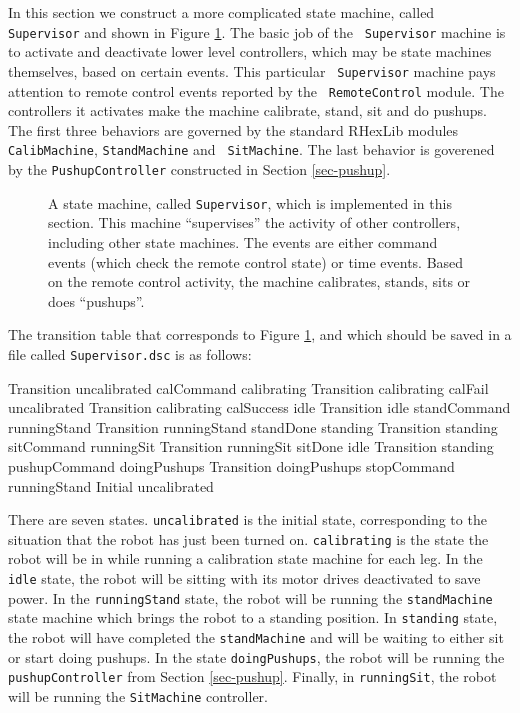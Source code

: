 In this section we construct a more complicated state machine, called {\tt
Supervisor} and shown in Figure \ref{fig-supervisor}. The basic job of the {\tt
Supervisor} machine is to activate and deactivate lower level controllers, which
may be state machines themselves, based on certain events. This particular {\tt
Supervisor} machine pays attention to remote control events reported by the {\tt
RemoteControl} module. The controllers it activates make the machine calibrate,
stand, sit and do pushups. The first three behaviors are governed by the
standard RHexLib modules {\tt CalibMachine}, {\tt StandMachine} and {\tt
SitMachine}. The last behavior is goverened by the {\tt PushupController}
constructed in Section \ref{sec-pushup}.

\begin{figure}[t]
\begin{center}
\caption{A state machine, called {\tt Supervisor}, which is implemented
in this section. This machine ``supervises'' the activity of other controllers,
including other state machines. The events are either command events (which
check the remote control state) or time events. Based on the remote control
activity, the machine calibrates, stands, sits or does ``pushups''.
\label{fig-supervisor}
}\end{center}
\end{figure}

The transition table that corresponds to Figure \ref{fig-supervisor}, and which
should be saved in a file called {\tt Supervisor.dsc} is as follows:

\begin{codesegment}
  Transition uncalibrated calCommand calibrating
  Transition calibrating calFail uncalibrated
  Transition calibrating calSuccess idle
  Transition idle standCommand runningStand
  Transition runningStand standDone standing
  Transition standing sitCommand runningSit
  Transition runningSit sitDone idle
  Transition standing pushupCommand doingPushups
  Transition doingPushups stopCommand runningStand
  Initial uncalibrated
\end{codesegment}

There are seven states. {\tt uncalibrated} is the initial state, corresponding
to the situation that the robot has just been turned on. {\tt calibrating} is
the state the robot will be in while running a calibration state machine for
each leg. In the {\tt idle} state, the robot will be sitting with its motor
drives deactivated to save power. In the {\tt runningStand} state, the robot
will be running the {\tt standMachine} state machine which brings the robot to a
standing position. In {\tt standing} state, the robot will have completed the
{\tt standMachine} and will be waiting to either sit or start doing pushups. In
the state {\tt doingPushups}, the robot will be running the {\tt
pushupController} from Section \ref{sec-pushup}. Finally, in {\tt runningSit},
the robot will be running the {\tt SitMachine} controller.

